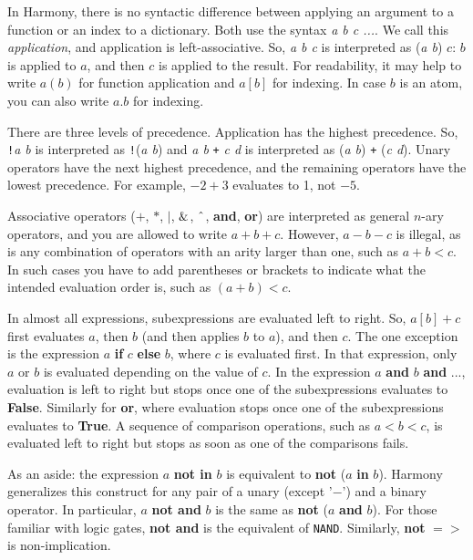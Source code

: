 \documentclass{report}
\begin{document}
In Harmony, there is no syntactic difference between applying an argument to a function
or an index to a dictionary.  Both use the syntax \textit{a b c ...}.
We call this \emph{application}, and application is left-associative.
So, \textit{a b c} is interpreted as (\textit{a b}) $c$: $b$ is applied to $a$,
and then $c$ is applied to the result.
For readability, it may help to write $a(b)$ for function application and
$a[b]$ for indexing.  In case $b$ is an atom, you can also write $a.b$ for indexing.

There are three levels of precedence.
Application has the highest precedence.  So, \texttt{!}\textit{a b} is interpreted as
\texttt{!}(\textit{a b}) and \textit{a b} \texttt{+} \textit{c d} is interpreted as
(\textit{a b}) \texttt{+} (\textit{c d}).
Unary operators have the next highest precedence,
and the remaining operators have the lowest precedence.
For example, $-2 + 3$ evaluates to 1, not $-5$.

Associative operators ($+$, $*$, $|$, $\string&$, $\string^$, \textbf{and}, \textbf{or})
are interpreted as general $n$-ary operators, and you are allowed to write
$a + b + c$.  However, $a - b - c$ is illegal, as is any combination of operators with an
arity larger than one, such as $a + b < c$.
In such cases you have to add parentheses or brackets to indicate what
the intended evaluation order is, such as $(a + b) < c$.

In almost all expressions, subexpressions are evaluated left to right.
So, $a[b] + c$
first evaluates $a$, then $b$ (and then applies $b$ to $a$), and then $c$.  The one
exception is the expression $a$ \textbf{if} $c$ \textbf{else} $b$, where $c$ is evaluated
first.  In that expression, only $a$ or $b$ is evaluated depending on the value of $c$.
In the expression $a$ \textbf{and} $b$ \textbf{and} $...$, evaluation is left
to right but stops once one of the subexpressions evaluates to \textbf{False}.
Similarly for \textbf{or}, where evaluation stops once one of the subexpressions
evaluates to \textbf{True}.
A sequence of comparison operations, such as $a < b < c$, is evaluated left to right
but stops as soon as one of the comparisons fails.

As an aside:
the expression $a$ \textbf{not in} $b$ is equivalent to \textbf{not} ($a$ \textbf{in} $b$).
Harmony generalizes this construct for any pair of a unary (except '$-$') and a binary operator.
In particular, $a$ \textbf{not and} $b$ is the same as \textbf{not} ($a$ \textbf{and} $b$).  
For those familiar with logic gates, \textbf{not and} is the equivalent of \texttt{NAND}.
Similarly, \textbf{not} \texttt{$=>$} is non-implication.
\end{document}
